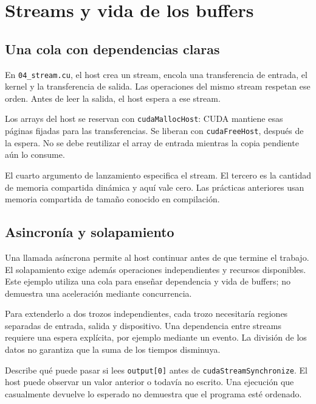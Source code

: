 \documentclass[12pt,a4paper,oneside]{report}
\begin{document}
\chapter{Streams y vida de los buffers}
\section{Una cola con dependencias claras}
En \texttt{04\_stream.cu}, el host crea un stream, encola una transferencia de entrada, el kernel y la transferencia de salida. Las operaciones del mismo stream respetan ese orden. Antes de leer la salida, el host espera a ese stream.

Los arrays del host se reservan con \texttt{cudaMallocHost}: CUDA mantiene esas páginas fijadas para las transferencias. Se liberan con \texttt{cudaFreeHost}, después de la espera. No se debe reutilizar el array de entrada mientras la copia pendiente aún lo consume.

\begin{center}
\end{center}
El cuarto argumento de lanzamiento especifica el stream. El tercero es la cantidad de memoria compartida dinámica y aquí vale cero. Las prácticas anteriores usan memoria compartida de tamaño conocido en compilación.

\section{Asincronía y solapamiento}
Una llamada asíncrona permite al host continuar antes de que termine el trabajo. El solapamiento exige además operaciones independientes y recursos disponibles. Este ejemplo utiliza una cola para enseñar dependencia y vida de buffers; no demuestra una aceleración mediante concurrencia.

Para extenderlo a dos trozos independientes, cada trozo necesitaría regiones separadas de entrada, salida y dispositivo. Una dependencia entre streams requiere una espera explícita, por ejemplo mediante un evento. La división de los datos no garantiza que la suma de los tiempos disminuya.

\begin{practica}
Describe qué puede pasar si lees \texttt{output[0]} antes de \texttt{cudaStreamSy\allowbreak{}nchronize}. El host puede observar un valor anterior o todavía no escrito. Una ejecución que casualmente devuelve lo esperado no demuestra que el programa esté ordenado.

\end{practica}
\end{document}
